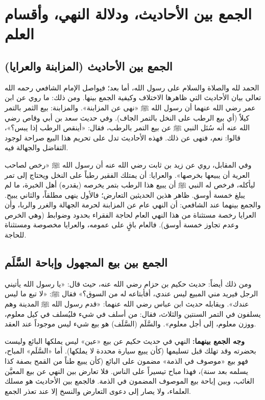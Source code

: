 \chapter{الجمع بين الأحاديث، ودلالة النهي، وأقسام العلم}

\section{الجمع بين الأحاديث (المزابنة والعرايا)}
الحمد لله والصلاة والسلام على رسول الله، أما بعد؛ فيواصل الإمام الشافعي رحمه الله تعالى بيان الأحاديث التي ظاهرها الاختلاف وكيفية الجمع بينها.
ومن ذلك: ما روي عن ابن عمر رضي الله عنهما أن رسول الله ﷺ «نهى عن المزابنة». والمزابنة: بيع الثمر بالتمر كيلاً (أي بيع الرطب على النخل بالتمر الجاف). وفي حديث سعد بن أبي وقاص رضي الله عنه أنه سُئل النبي ﷺ عن بيع التمر بالرطب، فقال: «أينقص الرطب إذا يبس؟»، قالوا: نعم، فنهى عن ذلك. 
فهذه الأحاديث تدل على تحريم هذا البيع صراحة لوجود التفاضل والجهالة فيه.

وفي المقابل، روي عن زيد بن ثابت رضي الله عنه أن رسول الله ﷺ «رخص لصاحب العرية أن يبيعها بخرصها». والعرايا: أن يمتلك الفقير رطباً على النخل ويحتاج إلى تمر ليأكله، فرخص له النبي ﷺ أن يبيع هذا الرطب بتمر يخرصه (يقدره) أهل الخبرة، ما لم يبلغ خمسة أوسق.
ظاهر هذين الحديثين التعارض؛ فالأول ينهى مطلقاً، والثاني يبيح. والجمع بينهما عند الشافعي: أن النهي عام عن المزابنة لحرمة الجهالة والغرر والربا، وأن العرايا رخصة مستثناة من هذا النهي العام لحاجة الفقراء بحدود وضوابط (وهي الخرص وعدم تجاوز خمسة أوسق). فالعام باقٍ على عمومه، والعرايا مخصوصة ومستثناة للحاجة.

\section{الجمع بين بيع المجهول وإباحة السَّلَم}
ومن ذلك أيضاً: حديث حكيم بن حزام رضي الله عنه، حيث قال: «يا رسول الله يأتيني الرجل فيريد مني المبيع ليس عندي، أفأبتاعه له من السوق؟» فقال ﷺ: «لا تبع ما ليس عندك».
ويقابله حديث ابن عباس رضي الله عنهما: «قدم رسول الله ﷺ المدينة وهم يسلفون في التمر السنتين والثلاث، فقال: من أسلف في شيء فليُسلف في كيل معلوم، ووزن معلوم، إلى أجل معلوم». والسَّلَم (السَّلَف) هو بيع شيء ليس موجوداً عند العقد.

\textbf{وجه الجمع بينهما:}
النهي في حديث حكيم عن بيع «عين» ليس يملكها البائع وليست بحضرته وقد تهلك قبل تسليمها (كأن يبيع سيارة محددة لا يملكها). أما «السَّلَم» المباح، فهو بيع «موصوف في الذمة» مضمون على البائع (كأن يبيع طناً من القمح بصفة كذا يسلمه بعد سنة)، فهذا مباح تيسيراً على الناس. فلا تعارض بين النهي عن بيع المعيَّن الغائب، وبين إباحة بيع الموصوف المضمون في الذمة. 
فالجمع بين الأحاديث هو مسلك العلماء، ولا يصار إلى دعوى التعارض والنسخ إلا عند تعذر الجمع.

